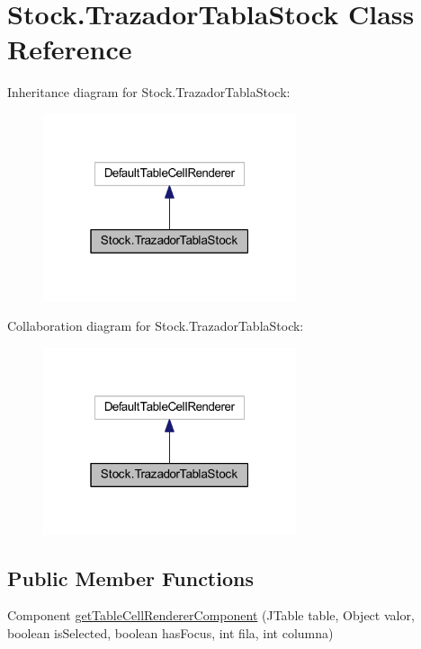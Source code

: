 \hypertarget{class_stock_1_1_trazador_tabla_stock}{}\section{Stock.\+Trazador\+Tabla\+Stock Class Reference}
\label{class_stock_1_1_trazador_tabla_stock}


Inheritance diagram for Stock.\+Trazador\+Tabla\+Stock\+:
\nopagebreak
\begin{figure}[H]
\begin{center}
\leavevmode
\includegraphics[width=211pt]{class_stock_1_1_trazador_tabla_stock__inherit__graph}
\end{center}
\end{figure}


Collaboration diagram for Stock.\+Trazador\+Tabla\+Stock\+:
\nopagebreak
\begin{figure}[H]
\begin{center}
\leavevmode
\includegraphics[width=211pt]{class_stock_1_1_trazador_tabla_stock__coll__graph}
\end{center}
\end{figure}
\subsection*{Public Member Functions}
\begin{DoxyCompactItemize}
\item 
Component \mbox{\hyperlink{class_stock_1_1_trazador_tabla_stock_af81dec01f5dd5a106ba9e04cbd15ded5}{get\+Table\+Cell\+Renderer\+Component}} (J\+Table table, Object valor, boolean is\+Selected, boolean has\+Focus, int fila, int columna)
\end{DoxyCompactItemize}


